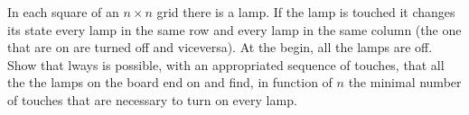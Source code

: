In each square of an $n\times{n}$ grid there is a lamp. If the lamp is touched it changes its state every lamp in the same row and every lamp in the same column (the one that are on are turned off and viceversa). At the begin, all the lamps are off. Show that  lways is possible, with an appropriated sequence of touches, that all the the lamps on the board end on and find, in function of $n$ the minimal number of touches that are necessary to turn on every lamp.